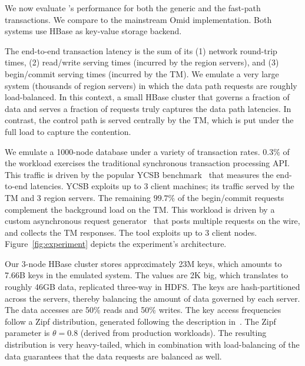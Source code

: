 We now evaluate {\sys}'s performance for both the generic and the fast-path transactions. 
We compare {\sys\/} to the mainstream Omid implementation. Both systems use HBase 
as key-value storage backend. 

The end-to-end transaction latency is the sum of its (1) network round-trip times, (2) read/write serving times (incurred 
by the region servers), and (3) begin/commit serving times (incurred by the TM). We emulate a very large system 
(thousands of region servers) in which the data path requests are roughly load-balanced. In this context, a small HBase 
cluster that governs a fraction of data and serves a fraction of requests truly captures the data path latencies. In 
contrast, the control path is served centrally by the TM, which is put under the full load to capture the contention.  

We emulate a 1000-node database under a variety of transaction rates. $0.3\%$ of the workload exercises the traditional 
synchronous transaction processing API. This traffic is driven by the popular YCSB benchmark~\cite{Cooper:2010:BCS:1807128.1807152} 
that measures the end-to-end latencies. YCSB exploits up to 3 client machines; its traffic served by the TM and 3 region servers. 
The remaining $99.7\%$ of the begin/commit requests complement the background load on the TM. This workload is driven 
by a custom asynchronous request generator~\cite{Omid2017} that posts multiple requests on the wire, and collects the TM 
responses. The tool exploits up to 3 client nodes. Figure~\ref{fig:experiment} depicts the experiment's architecture. 

Our 3-node HBase cluster stores approximately 23M keys, which amounts to 7.66B keys in the emulated system. 
The values are 2K big, which translates to roughly 46GB data, replicated three-way in HDFS. The keys are hash-partitioned
across the servers, thereby balancing the amount of data governed by each server. The data accesses are 50\% reads and 
50\% writes. The key access frequencies follow a Zipf distribution, generated following the description in~\cite{Gray:1994:QGB:191839.191886}. 
The Zipf parameter is $\theta=0.8$ (derived from production workloads). The resulting distribution is very heavy-tailed, which 
in combination with load-balancing of the data guarantees that the data requests are balanced as well. 


